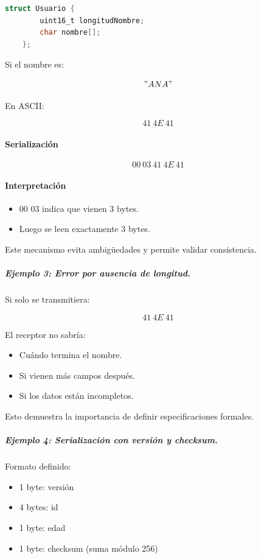 \documentclass[12pt,twoside]{book}
\begin{document}
						\begin{lstlisting}[language=C]
	struct Usuario {
		uint16_t longitudNombre;
		char nombre[];
	}; \end{lstlisting}
						
						Si el nombre es:
						
						\[
						"ANA"
						\]
						
						En ASCII:
						
						\[
						41\ 4E\ 41
						\]
						
						\paragraph{Serialización}
						
						\[
						00\ 03\ 41\ 4E\ 41
						\]
						
						\paragraph{Interpretación}
						
						\begin{itemize}
							\item 00 03 indica que vienen 3 bytes.
							\item Luego se leen exactamente 3 bytes.
						\end{itemize}
						
						Este mecanismo evita ambigüedades y permite validar consistencia.
						
						\subparagraph{Ejemplo 3: Error por ausencia de longitud.} Si solo se transmitiera:
						
						\[
						41\ 4E\ 41
						\]
						
						El receptor no sabría:
						
						\begin{itemize}
							\item Cuándo termina el nombre.
							\item Si vienen más campos después.
							\item Si los datos están incompletos.
						\end{itemize}
						
						Esto demuestra la importancia de definir especificaciones formales.
						
						\subparagraph{Ejemplo 4: Serialización con versión y checksum.} Formato definido:
						
						\begin{itemize}
							\item 1 byte: versión
							\item 4 bytes: id
							\item 1 byte: edad
							\item 1 byte: checksum (suma módulo 256)
						\end{itemize}
						
\end{document}
